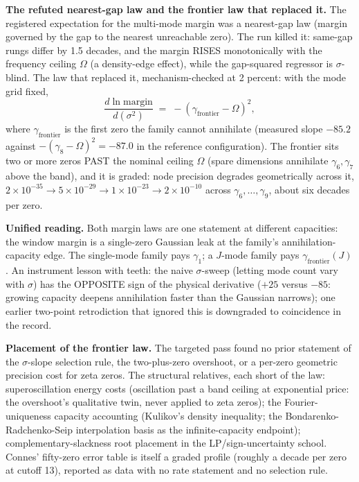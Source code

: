 \documentclass[10pt]{article}
\begin{document}
\textbf{The refuted nearest-gap law and the frontier law that replaced it.} The registered expectation for the multi-mode margin was a nearest-gap law (margin governed by the gap to the nearest unreachable zero). The run killed it: same-gap rungs differ by 1.5 decades, and the margin RISES monotonically with the frequency ceiling $\Omega$ (a density-edge effect), while the gap-squared regressor is $\sigma$-blind. The law that replaced it, mechanism-checked at 2 percent: with the mode grid fixed,
\[
\frac{d \ln \mathrm{margin}}{d(\sigma^2)} \;=\; -(\gamma_{\mathrm{frontier}} - \Omega)^2,
\]
where $\gamma_{\mathrm{frontier}}$ is the first zero the family cannot annihilate (measured slope $-85.2$ against $-(\gamma_8 - \Omega)^2 = -87.0$ in the reference configuration). The frontier sits two or more zeros PAST the nominal ceiling $\Omega$ (spare dimensions annihilate $\gamma_6, \gamma_7$ above the band), and it is graded: node precision degrades geometrically across it, $2 \times 10^{-35} \to 5 \times 10^{-29} \to 1 \times 10^{-23} \to 2 \times 10^{-10}$ across $\gamma_6, \ldots, \gamma_9$, about six decades per zero.

\textbf{Unified reading.} Both margin laws are one statement at different capacities: the window margin is a single-zero Gaussian leak at the family's annihilation-capacity edge. The single-mode family pays $\gamma_1$; a $J$-mode family pays $\gamma_{\mathrm{frontier}}(J)$. An instrument lesson with teeth: the naive $\sigma$-sweep (letting mode count vary with $\sigma$) has the OPPOSITE sign of the physical derivative ($+25$ versus $-85$: growing capacity deepens annihilation faster than the Gaussian narrows); one earlier two-point retrodiction that ignored this is downgraded to coincidence in the record.

\textbf{Placement of the frontier law.} The targeted pass found no prior statement of the $\sigma$-slope selection rule, the two-plus-zero overshoot, or a per-zero geometric precision cost for zeta zeros. The structural relatives, each short of the law: superoscillation energy costs (oscillation past a band ceiling at exponential price: the overshoot's qualitative twin, never applied to zeta zeros); the Fourier-uniqueness capacity accounting (Kulikov's density inequality; the Bondarenko-Radchenko-Seip interpolation basis as the infinite-capacity endpoint); complementary-slackness root placement in the LP/sign-uncertainty school. Connes' fifty-zero error table is itself a graded profile (roughly a decade per zero at cutoff 13), reported as data with no rate statement and no selection rule.
\end{document}
